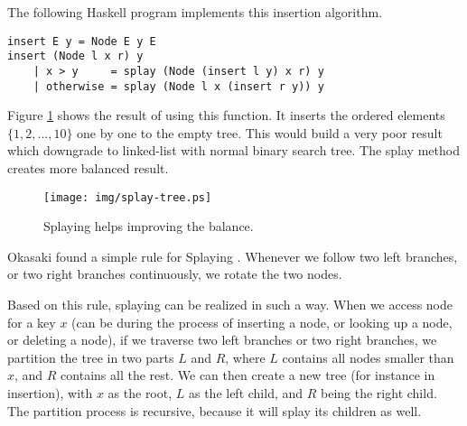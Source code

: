 \documentclass[UTF8]{article}
\begin{document}
The following Haskell program implements this insertion algorithm.

\lstset{language=Haskell}
\begin{lstlisting}
insert E y = Node E y E
insert (Node l x r) y
    | x > y     = splay (Node (insert l y) x r) y
    | otherwise = splay (Node l x (insert r y)) y
\end{lstlisting}

Figure \ref{fig:splay-result} shows the result of using this function.
It inserts the ordered elements $\{1, 2, ..., 10\}$
one by one to the empty tree. This would build a very poor result
which downgrade to linked-list with normal binary search tree.
The splay method creates more balanced result.

\begin{figure}[htbp]
  \centering
  \texttt{[image: img/splay-tree.ps]}
  \caption{Splaying helps improving the balance.}
  \label{fig:splay-result}
\end{figure}

Okasaki found a simple rule for Splaying \cite{okasaki-book}.
Whenever we follow
two left branches, or two right branches continuously, we rotate
the two nodes.

Based on this rule, splaying can be realized in such a way.
When we access node for a key $x$ (can be during the process of
inserting a node, or looking up a node, or deleting a node), if
we traverse two left branches or two right branches, we
partition the tree in two parts $L$ and $R$, where $L$ contains all
nodes smaller than $x$, and $R$ contains all the rest.
We can then create a new tree (for instance in insertion),
with $x$ as the root, $L$ as the left child, and $R$ being the right child.
The partition process is recursive, because it will splay
its children as well.
\end{document}
